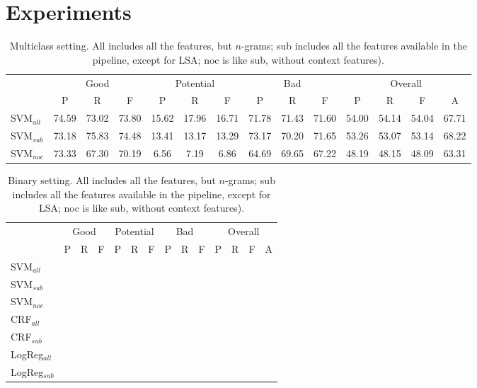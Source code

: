 \section{Experiments}

\begin{table*}
\caption{Multiclass setting. All includes all the features, but $n$-grams; sub includes all the features available in the pipeline, except for LSA; noc is like sub, without context features). }

\begin{tabular}{lccccccccccccc}
\hline
				& \multicolumn{3}{c}{Good}	& \multicolumn{3}{c}{Potential} &\multicolumn{3}{c}{Bad} & \multicolumn{4}{c}{Overall}\\
						&	P			& R			& F			&	P			& R			& F			& 	P			& R			& F			& 	P				& R			& F			& A	\\
\hline
SVM$_{all}$		& 	74.59	& 73.02	& 73.80	& 15.62	& 17.96	& 16.71	& 	71.78	& 71.43	& 71.60	& 	54.00	& 54.14	&	54.04	& 67.71	\\
SVM$_{sub}$	& 73.18	& 75.83	& 74.48	& 13.41	& 13.17	& 13.29	& 73.17	& 	70.20	& 	71.65	& 	53.26	& 53.07	&	53.14	& 68.22	\\
SVM$_{noc}$	& 	73.33	& 67.30	& 	70.19	&  6.56	& 	7.19		&  6.86	& 64.69	& 	69.65	& 67.22	& 48.19	& 48.15	&	48.09	& 63.31	\\
				
\hline
\end{tabular}
\end{table*}

\begin{table*}
\caption{Binary setting. All includes all the features, but $n$-grams; sub includes all the features available in the pipeline, except for LSA; noc is like sub, without context features). }

\begin{tabular}{lccccccccccccc}
\hline
				& \multicolumn{3}{c}{Good}	& \multicolumn{3}{c}{Potential} &\multicolumn{3}{c}{Bad} & \multicolumn{4}{c}{Overall}\\
						&	P			& R			& F			&	P			& R			& F			& 	P			& R			& F			& 	P				& R			& F			& A	\\
\hline
SVM$_{all}$		& 		& 	& 	& 	& 	& 	& 		& 	& 	& 		& 	&		& 	\\
SVM$_{sub}$	& 		& 	& 	& 	& 	& 	& 		& 	& 	& 		& 	&		& 	\\
SVM$_{noc}$	& 		& 	& 	& 	& 	& 	& 		& 	& 	& 		& 	&		& 	\\
CRF$_{all}$		& 		& 	& 	& 	& 	& 	& 		& 	& 	& 		& 	&		& 	\\
CRF$_{sub}$	& 		& 	& 	& 	& 	& 	& 		& 	& 	& 		& 	&		& 	\\
LogReg$_{all}$	& 		& 	& 	& 	& 	& 	& 		& 	& 	& 		& 	&		& 	\\
LogReg$_{sub}$	& 		& 	& 	& 	& 	& 	& 		& 	& 	& 		& 	&		& 	\\				
\hline
\end{tabular}
\end{table*}